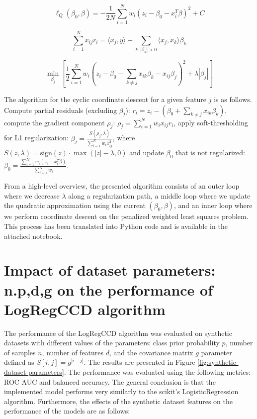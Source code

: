 \documentclass[11pt]{article}
\begin{document}
\begin{equation}\label{eq:quadratic-approximation}
\ell_Q(\beta_0, \beta) = -\frac{1}{2N} \sum_{i=1}^{N} w_i (z_i - \beta_0 - x_i^T \beta)^2 + C
\end{equation}


\begin{equation}\label{eq:covariance-update}
\sum_{i=1}^{N} x_{ij} r_i = \langle x_j, y \rangle - \sum_{k: |\beta_k| > 0} \langle x_j, x_k \rangle \beta_k
\end{equation}

\begin{equation}\label{eq:feature-minimization}
    \min_{\beta_j} \left[ \frac{1}{2} \sum_{i=1}^{N} w_i \left( z_i - \beta_0 - \sum_{k \neq j} x_{ik} \beta_k - x_{ij} \beta_j \right)^2 + \lambda |\beta_j| \right]
\end{equation}


The algorithm for the cyclic coordinate descent for a given feature $j$ is as follows. Compute partial residuals (excluding $\beta_j$): $r_i = z_i - (\beta_0 + \sum_{k \neq j} x_{ik} \beta_k)$, compute the gradient component $\rho_j$: $\rho_j = \sum_{i=1}^{N} w_i x_{ij} r_i$, apply soft-thresholding for L1 regularization: $\beta_j = \frac{S(\rho_j, \lambda)}{\sum_{i=1}^{N} w_i x_{ij}^2}$, where $S(z, \lambda) = \text{sign}(z) \cdot \max(|z| - \lambda, 0)$ and update $\beta_0$ that is not regularized: $\beta_0 = \frac{\sum_{i=1}^{N} w_i (z_i - x_i^T \beta)}{\sum_{i=1}^{N} w_i}$.


From a high-level overview, the presented algorithm consists of an outer loop where we decrease $\lambda$ along a regularization path, a middle loop where we update the quadratic approximation using the current $(\beta_0, \beta)$, and an inner loop where we perform coordinate descent on the penalized weighted least squares problem. This process has been translated into Python code and is available in the attached notebook.



\section{Impact of dataset parameters: n.p,d,g on the performance of LogRegCCD algorithm}

The performance of the LogRegCCD algorithm was evaluated on synthetic datasets with different values of the parameters: class prior probability $p$, number of samples $n$, number of features $d$, and the covariance matrix $g$ parameter defined as $S[i,j] = g^{|i-j|}$. The results are presented in Figure \ref{fig:synthetic-dataset-parameters}. The performance was evaluated using the following metrics: ROC AUC and balanced accuracy. The general conclusion is that the implemented model performs very similarly to the scikit's LogisticRegression algorithm. Furthermore, the effects of the synthetic dataset features on the performance of the models are as follows:
\end{document}
